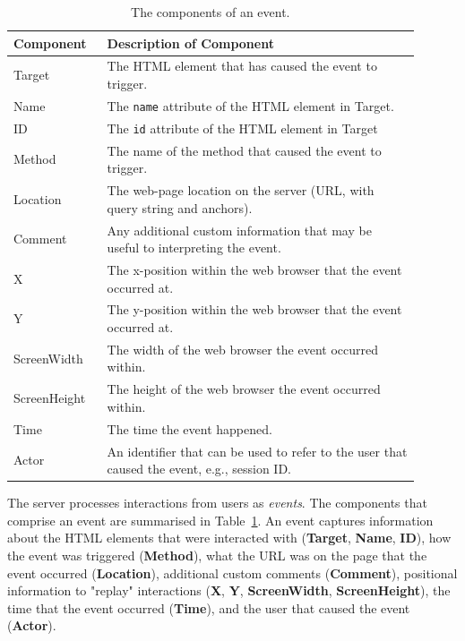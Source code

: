 \begin{table}
\centering
\begin{tabular}{p{0.2\linewidth}p{0.7\linewidth}}
\hline
Component & Description of Component \\
\hline
Target & The HTML element that has caused the event to trigger. \\
Name & The \texttt{name} attribute of the HTML element in Target. \\
ID & The \texttt{id} attribute of the HTML element in Target\\
Method & The name of the method that caused the event to trigger. \\
Location & The web-page location on the server (URL, with query string and anchors). \\
Comment & Any additional custom information that may be useful to interpreting the event. \\
X & The x-position within the web browser that the event occurred at. \\
Y & The y-position within the web browser that the event occurred at. \\
ScreenWidth & The width of the web browser the event occurred within. \\
ScreenHeight & The height of the web browser the event occurred within. \\
Time & The time the event happened.\\
Actor & An identifier that can be used to refer to the user that caused the event, e.g., session ID. \\
\hline
\end{tabular}
\caption{The components of an event.\vspace{-16pt}}
\label{tbl:event}
\end{table}

The server processes interactions from users as \textit{events}. The components that comprise an event are summarised in Table~\ref{tbl:event}.
An event captures information about the HTML elements that were interacted with (\textbf{Target}, \textbf{Name}, \textbf{ID}), how the event was triggered (\textbf{Method}), what the URL was on the page that the event occurred (\textbf{Location}), additional custom comments (\textbf{Comment}), positional information to "replay" interactions (\textbf{X}, \textbf{Y}, \textbf{ScreenWidth}, \textbf{ScreenHeight}), the time that the event occurred (\textbf{Time}), and the user that caused the event (\textbf{Actor}).

